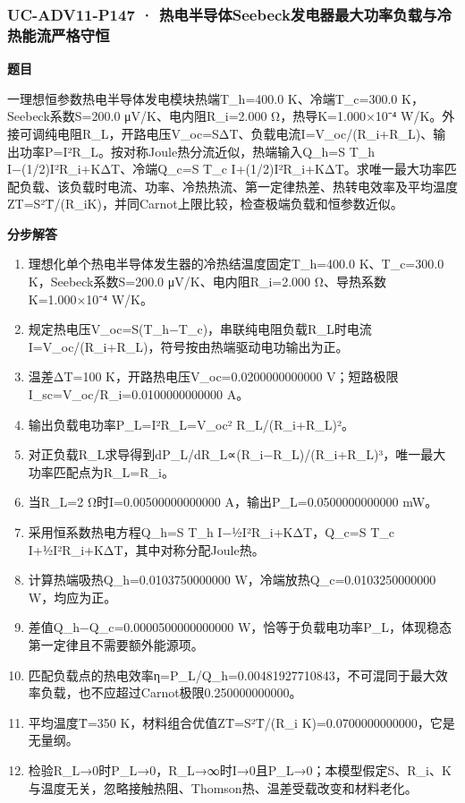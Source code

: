 \documentclass[UTF8,11pt,a4paper]{ctexart}
\begin{document}
\subsubsection*{UC-ADV11-P147 · 热电半导体Seebeck发电器最大功率负载与冷热能流严格守恒}
\noindent\textbf{题目}\par
一理想恒参数热电半导体发电模块热端T\_h=400.0 K、冷端T\_c=300.0 K，Seebeck系数S=200.0 μV/K、电内阻R\_i=2.000 Ω，热导K=1.000×10⁻⁴ W/K。外接可调纯电阻R\_L，开路电压V\_oc=SΔT、负载电流I=V\_oc/(R\_i+R\_L)、输出功率P=I²R\_L。按对称Joule热分流近似，热端输入Q\_h=S T\_h I−(1/2)I²R\_i+KΔT、冷端Q\_c=S T\_c I+(1/2)I²R\_i+KΔT。求唯一最大功率匹配负载、该负载时电流、功率、冷热热流、第一定律热差、热转电效率及平均温度ZT=S²T̄/(R\_iK)，并同Carnot上限比较，检查极端负载和恒参数近似。\par
\medskip\noindent\textbf{分步解答}
\begin{enumerate}
\item 理想化单个热电半导体发生器的冷热结温度固定T\_h=400.0 K、T\_c=300.0 K，Seebeck系数S=200.0 μV/K、电内阻R\_i=2.000 Ω、导热系数K=1.000×10⁻⁴ W/K。
\item 规定热电压V\_oc=S(T\_h−T\_c)，串联纯电阻负载R\_L时电流I=V\_oc/(R\_i+R\_L)，符号按由热端驱动电功输出为正。
\item 温差ΔT=100 K，开路热电压V\_oc=0.0200000000000 V；短路极限I\_sc=V\_oc/R\_i=0.0100000000000 A。
\item 输出负载电功率P\_L=I²R\_L=V\_oc² R\_L/(R\_i+R\_L)²。
\item 对正负载R\_L求导得到dP\_L/dR\_L∝(R\_i−R\_L)/(R\_i+R\_L)³，唯一最大功率匹配点为R\_L=R\_i。
\item 当R\_L=2 Ω时I=0.00500000000000 A，输出P\_L=0.0500000000000 mW。
\item 采用恒系数热电方程Q\_h=S T\_h I−½I²R\_i+KΔT，Q\_c=S T\_c I+½I²R\_i+KΔT，其中对称分配Joule热。
\item 计算热端吸热Q\_h=0.0103750000000 W，冷端放热Q\_c=0.0103250000000 W，均应为正。
\item 差值Q\_h−Q\_c=0.0000500000000000 W，恰等于负载电功率P\_L，体现稳态第一定律且不需要额外能源项。
\item 匹配负载点的热电效率η=P\_L/Q\_h=0.00481927710843，不可混同于最大效率负载，也不应超过Carnot极限0.250000000000。
\item 平均温度T̄=350 K，材料组合优值ZT̄=S²T̄/(R\_i K)=0.0700000000000，它是无量纲。
\item 检验R\_L→0时P\_L→0，R\_L→∞时I→0且P\_L→0；本模型假定S、R\_i、K与温度无关，忽略接触热阻、Thomson热、温差受载改变和材料老化。
\end{enumerate}
\end{document}
